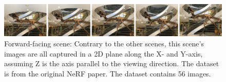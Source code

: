 \begin{figure}[!h]
    \centering
    \includegraphics[width=1.0\textwidth]{figures/trex-dataset.png}
    \caption{Forward-facing scene: Contrary to the other scenes, this scene's images are all captured in a 2D plane along the X- and Y-axis, assuming Z is the axis parallel to the viewing direction. The dataset is from the original NeRF paper\cite{mildenhall_nerf_2020}. The dataset contains 56 images.}
    \label{fig:trex-dataset}
\end{figure}
